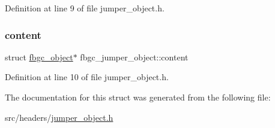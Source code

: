 Definition at line 9 of file jumper\+\_\+object.\+h.

\mbox{\label{structfbgc__jumper__object_a555a64a0eb002d9e28e0fd9a0d7dcda8}} 
\subsubsection{\texorpdfstring{content}{content}}
{\footnotesize\ttfamily struct \hyperlink{structfbgc__object}{fbgc\+\_\+object}$\ast$ fbgc\+\_\+jumper\+\_\+object\+::content}



Definition at line 10 of file jumper\+\_\+object.\+h.



The documentation for this struct was generated from the following file\+:\begin{DoxyCompactItemize}
\item 
src/headers/\hyperlink{jumper__object_8h}{jumper\+\_\+object.\+h}\end{DoxyCompactItemize}
